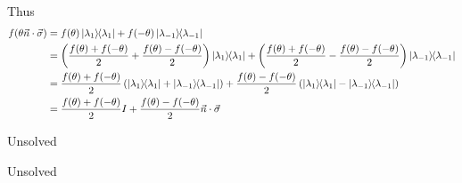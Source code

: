 Thus
\begin{align*}
	f(\theta \vec{n} \cdot \vec{\sigma}) &= f(\theta) \kb{\lambda_1} + f(- \theta) \kb{\lambda_{-1}}\\
		&= \left( \frac{f(\theta) + f(-\theta)}{2} + \frac{f(\theta) - f(-\theta)}{2}  \right) \kb{\lambda_1} + \left( \frac{f(\theta) + f(-\theta)}{2} - \frac{f(\theta) - f(-\theta)}{2}  \right)\kb{\lambda_{-1}}\\
		&= \frac{f(\theta) + f(-\theta)}{2} \left( \kb{\lambda_1} + \kb{\lambda_{-1}} \right) +  \frac{f(\theta) - f(-\theta)}{2} \left(\kb{\lambda_1} - \kb{\lambda_{-1}} \right)\\
		&= \frac{f(\theta) + f(-\theta)}{2} I + \frac{f(\theta) - f(-\theta)}{2} \vec{n} \cdot \vec{\sigma}
\end{align*}

Unsolved

Unsolved
